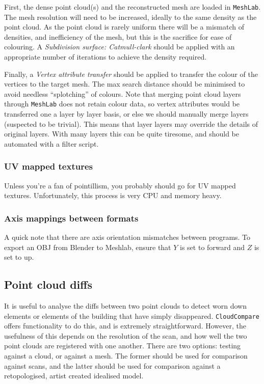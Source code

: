 First, the dense point cloud(s) and the reconstructed mesh are loaded in {\tt MeshLab}. The mesh resolution will need to be increased, ideally to the same density as the point cloud. As the point cloud is rarely uniform there will be a mismatch of densities, and inefficiency of the mesh, but this is the sacrifice for ease of colouring. A \emph{Subdivision surface: Catmull-clark} should be applied with an appropriate number of iterations to achieve the density required.

Finally, a \emph{Vertex attribute transfer} should be applied to transfer the colour of the vertices to the target mesh. The max search distance should be minimised to avoid needless ``splotching'' of colours. Note that merging point cloud layers through {\tt MeshLab} does not retain colour data, so vertex attributes would be transferred one a layer by layer basis, or else we should manually merge layers (suspected to be trivial). This means that layer layers may override the details of original layers. With many layers this can be quite tiresome, and should be automated with a filter script.

\subsubsection{UV mapped textures}

Unless you're a fan of pointillism, you probably should go for UV mapped textures. Unfortunately, this process is very CPU and memory heavy.

\subsubsection{Axis mappings between formats}

A quick note that there are axis orientation mismatches between programs. To export an OBJ from Blender to Meshlab, ensure that $Y$ is set to forward and $Z$ is set to up.

\subsection{Point cloud diffs}
It is useful to analyse the diffs between two point clouds to detect worn down elements or elements of the building that have simply disappeared. {\tt CloudCompare} offers functionality to do this, and is extremely straightforward. However, the usefulness of this depends on the resolution of the scan, and how well the two point clouds are registered with one another. There are two options: testing against a cloud, or against a mesh. The former should be used for comparison against scans, and the latter should be used for comparison against a retopologised, artist created idealised model.

